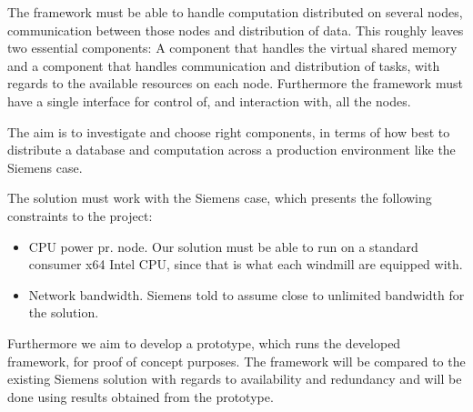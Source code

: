 The framework must be able to handle computation distributed on several nodes, communication between those nodes and distribution of data. This roughly leaves two essential components: A component that handles the virtual shared memory and a component that handles communication and distribution of tasks, with regards to the available resources on each node. Furthermore the framework must have a single interface for control of, and interaction with, all the nodes.

The aim is to investigate and choose right components, in terms of how best to distribute a database and computation across a production environment like the Siemens case. 


The solution must work with the Siemens case, which presents the following constraints to the project:
\begin{itemize} 
	\item CPU power pr. node. Our solution must be able to run on a standard consumer x64 Intel CPU, since that is what each windmill are equipped with.
	\item Network bandwidth. Siemens told to assume close to unlimited bandwidth for the solution. 
\end{itemize}

Furthermore we aim to develop a prototype, which runs the developed framework, for proof of concept purposes. The framework will be compared to the existing Siemens solution with regards to availability and redundancy and will be done using results obtained from the prototype. 




